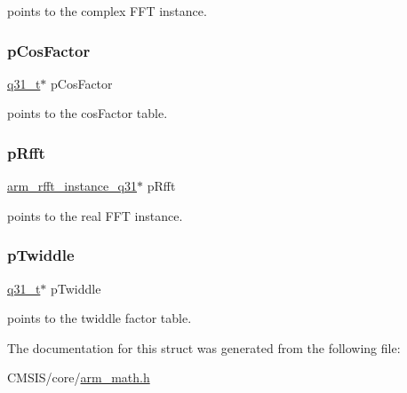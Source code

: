 points to the complex F\+FT instance. \mbox{\label{structarm__dct4__instance__q31_af06acf18dc6547fc29aba2eb68cc63f0}} 
\subsubsection{\texorpdfstring{pCosFactor}{pCosFactor}}
{\footnotesize\ttfamily \mbox{\hyperlink{arm__math_8h_adc89a3547f5324b7b3b95adec3806bc0}{q31\+\_\+t}}$\ast$ p\+Cos\+Factor}

points to the cos\+Factor table. \mbox{\label{structarm__dct4__instance__q31_a16c74f8496e1691e62da3c57e0c676eb}} 
\subsubsection{\texorpdfstring{pRfft}{pRfft}}
{\footnotesize\ttfamily \mbox{\hyperlink{structarm__rfft__instance__q31}{arm\+\_\+rfft\+\_\+instance\+\_\+q31}}$\ast$ p\+Rfft}

points to the real F\+FT instance. \mbox{\label{structarm__dct4__instance__q31_a2505b7d5ec077b244c712797a5253b6d}} 
\subsubsection{\texorpdfstring{pTwiddle}{pTwiddle}}
{\footnotesize\ttfamily \mbox{\hyperlink{arm__math_8h_adc89a3547f5324b7b3b95adec3806bc0}{q31\+\_\+t}}$\ast$ p\+Twiddle}

points to the twiddle factor table. 

The documentation for this struct was generated from the following file\+:\begin{DoxyCompactItemize}
\item 
C\+M\+S\+I\+S/core/\mbox{\hyperlink{arm__math_8h}{arm\+\_\+math.\+h}}\end{DoxyCompactItemize}
